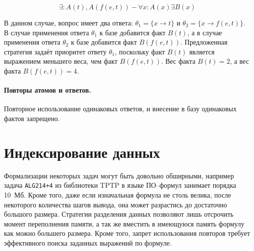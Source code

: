 $$\exists: A(t), A(f(e,t)) - \forall x:A(x) \exists B(x)$$

В данном случае, вопрос имеет два ответа: $\theta_1 = \{x \rightarrow t\}$  и $\theta_2 = \{x \rightarrow f(e,t)\}$. В случае применения ответа $\theta_1$ к базе добавится факт $B(t)$, а в случае применения ответа $\theta_2$ к базе добавится факт $B(f(e,t))$. Предложенная стратегия задаёт приоритет ответу $\theta_1$, поскольку факт $B(t)$ является выражением меньшего веса, чем факт $B(f(e,t))$. Вес факта $B(t)=2$, а вес факта $B(f(e,t))=4$.


\paragraph{Повторы атомов и ответов.} Повторное использование одинаковых ответов, и внесение в базу одинаковых фактов запрещено.





\section{Индексирование данных}

Формализации некоторых задач могут быть довольно обширными, например задача \texttt{ALG214+4} из библиотеки TPTP в языке ПО--формул занимает порядка 10~Мб. Кроме того, даже если изначальная формула не столь велика, после некоторого количества шагов вывода, она может разрастись до достаточно большого размера. Стратегии разделения данных позволяют лишь отсрочить момент переполнения памяти, а так же вместить в имеющуюся память формулу как можно большего размера. Кроме того, запрет использования повторов требует эффективного поиска заданных выражений по формуле.

